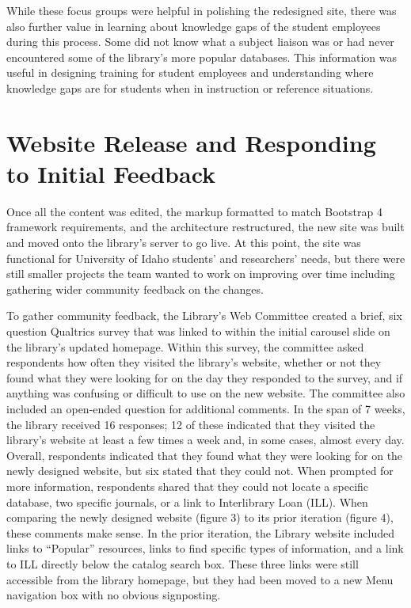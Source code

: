 \documentclass{book}
\begin{document}
While these focus groups were helpful in polishing the redesigned site, there
was also further value in learning about knowledge gaps of the student
employees during this process. Some did not know what a subject liaison was or
had never encountered some of the library's more popular databases. This
information was useful in designing training for student employees and
understanding where knowledge gaps are for students when in instruction or
reference situations.

\hypertarget{website-release-and-responding-to-initial-feedback}{%
\section{Website Release and Responding to Initial
Feedback}\label{website-release-and-responding-to-initial-feedback}}

Once all the content was edited, the markup formatted to match Bootstrap 4
framework requirements, and the architecture restructured, the new site was
built and moved onto the library's server to go live. At this point, the site
was functional for University of Idaho students' and researchers' needs, but
there were still smaller projects the team wanted to work on improving over
time including gathering wider community feedback on the changes.

To gather community feedback, the Library's Web Committee created a brief, six
question Qualtrics survey that was linked to within the initial carousel slide
on the library's updated homepage. Within this survey, the committee asked
respondents how often they visited the library's website, whether or not they
found what they were looking for on the day they responded to the survey, and
if anything was confusing or difficult to use on the new website. The
committee also included an open-ended question for additional comments. In the
span of 7 weeks, the library received 16 responses; 12 of these indicated that
they visited the library's website at least a few times a week and, in some
cases, almost every day. Overall, respondents indicated that they found what
they were looking for on the newly designed website, but six stated that they
could not. When prompted for more information, respondents shared that they
could not locate a specific database, two specific journals, or a link to
Interlibrary Loan (ILL). When comparing the newly designed website (figure 3)
to its prior iteration (figure 4), these comments make sense. In the prior
iteration, the Library website included links to ``Popular'' resources, links
to find specific types of information, and a link to ILL directly below the
catalog search box. These three links were still accessible from the library
homepage, but they had been moved to a new Menu navigation box with no obvious
signposting.
\end{document}
